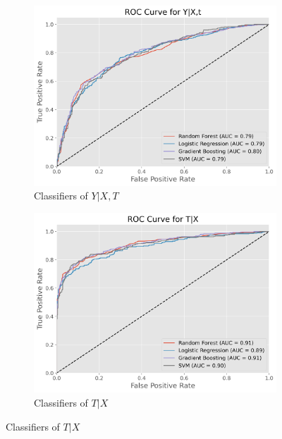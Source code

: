 \documentclass{article}
\newcommand{\gur}[1]{{\color{teal}{Gur: #1}}}
\begin{document}
\begin{figure}
    \centering
    \caption{ROC curves of possible classifiers \gur{change title and subtitles}}
    \label{fig:mainfig}
    \begin{subfigure}[b]{0.45\textwidth}
        \centering
        \includegraphics[width=\textwidth]{plots/ROC_curve_Y_given_XT.png}
        \caption{Classifiers of $Y | X, T$}
        \label{fig:ROC_curve_Y_given_XT}
    \end{subfigure}
    \hfill
    \begin{subfigure}[b]{0.45\textwidth}
        \centering
        \includegraphics[width=\textwidth]{plots/ROC_curve_T_given_X.png}
        \caption{Classifiers of $T | X$}
        \label{fig:ROC_curve_T_given_X}
    \end{subfigure}
\end{figure}
\end{document}
